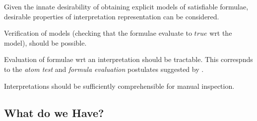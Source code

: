 \documentclass{easychair}
\newenvironment{packed_itemize}{
\vspace*{-0.3em}
\begin{itemize}
\setlength{\partopsep}{0pt}
\setlength{\itemsep}{1pt}
\setlength{\parskip}{0pt}
\setlength{\parsep}{0pt}
}{\end{itemize}}
\begin{document}
Given the innate desirability of obtaining explicit models of satisfiable formulae, desirable
properties of interpretation representation can be considered.
\begin{packed_itemize}
\item Verification of models (checking that the formulae evaluate to $true$ wrt the model), 
      should be possible.
\item Evaluation of formulae wrt an interpretation should be tractable.
      This correspnds to the {\em atom test} and {\em formula evaluation} postulates suggested
      by \cite{FL96,CLP04}.
\item Interpretations should be sufficiently comprehensible for manual inspection.
\end{packed_itemize}

\subsection{What do we Have?}
\label{Have}
\end{document}
